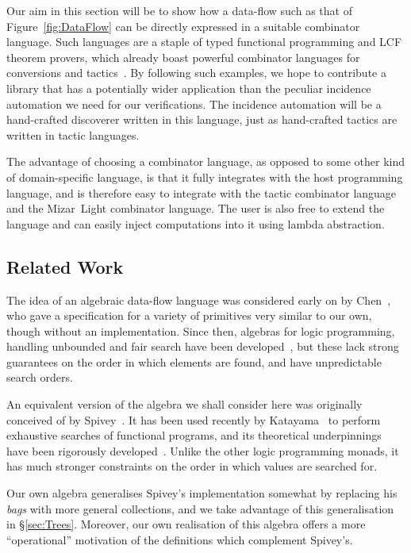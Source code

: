 Our aim in this section will be to show how a data-flow such as that of Figure~\ref{fig:DataFlow} can be directly expressed in a suitable combinator language. Such languages are a staple of typed functional programming and LCF theorem provers, which already boast powerful combinator languages for conversions and tactics~\cite{Tactics}. By following such examples, we hope to contribute a library that has a potentially wider application than the peculiar incidence automation we need for our verifications. The incidence automation will be a hand-crafted discoverer written in this language, just as hand-crafted tactics are written in tactic languages.

The advantage of choosing a combinator language, as opposed to some other kind of domain-specific language, is that it fully integrates with the host programming language, and is therefore easy to integrate with the tactic combinator language and the Mizar~Light combinator language. The user is also free to extend the language and can easily inject computations into it using lambda abstraction.

\subsection{Related Work}
The idea of an algebraic data-flow language was considered early on by Chen~\cite{ChenForwardChaining}, who gave a specification for a variety of primitives very similar to our own, though without an implementation. Since then, algebras for logic programming, handling unbounded and fair search have been developed~\cite{BacktrackingMonad,Omega}, but these lack strong guarantees on the order in which elements are found, and have unpredictable search orders.

An equivalent version of the algebra we shall consider here was originally conceived of by Spivey~\cite{SpiveyBreadthFirst}. It has been used recently by Katayama~\cite{ImprovementsMagickHaskeller} to perform exhaustive searches of functional programs, and its theoretical underpinnings have been rigorously developed~\cite{SearchAlgebras}. Unlike the other logic programming monads, it has much stronger constraints on the order in which values are searched for. 

Our own algebra generalises Spivey's implementation somewhat by replacing his \emph{bags} with more general collections, and we take advantage of this generalisation in \S\ref{sec:Trees}. Moreover, our own realisation of this algebra offers a more ``operational'' motivation of the definitions which complement Spivey's.

